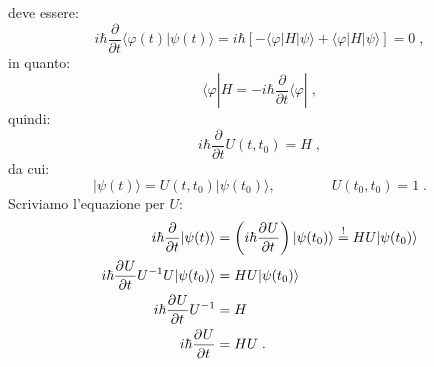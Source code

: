 \documentclass[12pt,a4paper]{report}
\theoremstyle{definition}
\newcommand{\pdev}[3][]{\frac{\partial^{#1} #2}{\partial #3^{#1}}}
\numberwithin{equation}{section}
\newcommand{\bra}{\langle}
\newcommand{\ket}{\rangle}
\begin{document}
deve essere:
\begin{equation}
i\hbar\frac{\partial}{\partial t}\bra\varphi(t)|\psi(t)\ket=i\hbar[-\bra\varphi|H|\psi\ket+\bra\varphi|H|\psi\ket]=0\;,
\end{equation}
in quanto:
$$
\bra\varphi|H=-i\hbar\frac{\partial}{\partial t}\bra\varphi|\;,
$$
quindi:
$$
i\hbar\frac{\partial}{\partial t}U(t,t_0)=H\;,
$$
da cui:
\begin{equation}
|\psi(t)\ket=U(t,t_0)|\psi(t_0)\ket, \qquad\qquad U(t_0,t_0)=1\;.
\end{equation}
Scriviamo l'equazione per $U$:
\begin{align}
i\hbar\frac{\partial}{\partial t}|\psi(t)\ket&=\left(i\hbar\pdev{U}{t}\right)|\psi(t_0)\ket\stackrel{!}{=}HU|\psi(t_0)\ket \notag \\
i\hbar\pdev{U}{t} U^{-1}U|\psi(t_0)\ket &= HU|\psi(t_0)\ket \notag \\
i\hbar\pdev{U}{t}U^{-1}&= H \notag \\
i\hbar\pdev{U}{t}&=HU\;.
\end{align}
\end{document}
